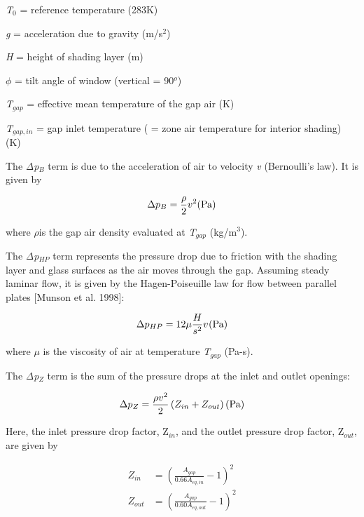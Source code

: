 \emph{T\(_{0}\)} = reference temperature (283K)

\emph{g} = acceleration due to gravity (m/s\(^{2}\))

\emph{H} = height of shading layer (m)

\emph{$\phi$} = tilt angle of window (vertical = 90\(^{o}\))

\emph{T\(_{gap}\)} = effective mean temperature of the gap air (K)

\emph{T\(_{gap,in}\)} = gap inlet temperature ( = zone air temperature for interior shading) (K)

The \emph{Δp\(_{B}\)} term is due to the acceleration of air to velocity \emph{v} (Bernoulli's law). It is given by

\begin{equation}
\Delta {p_B} = \frac{\rho }{2}{v^2}{\rm{    (Pa)}}
\end{equation}

where \emph{$\rho$}is the gap air density evaluated at \emph{T\(_{gap}\)} (kg/m\(^{3}\)).

The \emph{Δp\(_{HP}\)} term represents the pressure drop due to friction with the shading layer and glass surfaces as the air moves through the gap. Assuming steady laminar flow, it is given by the Hagen-Poiseuille law for flow between parallel plates {[}Munson et al. 1998{]}:

\begin{equation}
\Delta {p_{HP}} = 12\mu \frac{H}{{{s^2}}}{v^{}}{\rm{    (Pa)}}
\end{equation}

where \emph{$\mu$} is the viscosity of air at temperature \emph{T\(_{gap}\)} (Pa-s).

The \emph{Δp\(_{Z}\)} term is the sum of the pressure drops at the inlet and outlet openings:

\begin{equation}
\Delta {p_Z} = \frac{{\rho {v^2}}}{2}\left( {{Z_{in}} + {Z_{out}}} \right){\rm{    (Pa)}}
\end{equation}

Here, the inlet pressure drop factor, Z\(_{in}\), and the outlet pressure drop factor, Z\(_{out}\), are given by

\begin{equation}
  \begin{array}{rl}
    Z_{in}  & = \left( \frac{A_{gap}}{0.66A_{eq,in}}  - 1 \right)^2 \\
    Z_{out} & = \left( \frac{A_{gap}}{0.60A_{eq,out}} - 1 \right)^2
  \end{array}
\end{equation}

